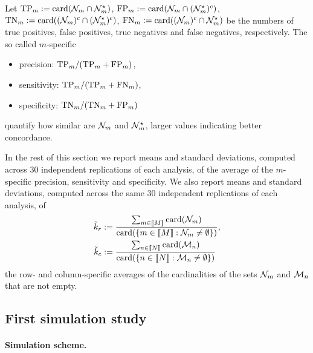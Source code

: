Let     $\text{TP}_{m}     :=      \operatorname{card}(\mathcal{N}_{m}     \cap     \mathcal{N}_{m}^{\star})$,
$\text{FP}_{m}      :=      \operatorname{card}(\mathcal{N}_{m}     \cap      (\mathcal{N}_{m}^{\star})^{c})$,
$\text{TN}_{m}    :=     \operatorname{card}((\mathcal{N}_{m})^{c}    \cap    (\mathcal{N}_{m}^{\star})^{c})$,
$\text{FN}_{m} :=  \operatorname{card}((\mathcal{N}_{m})^{c} \cap \mathcal{N}_{m}^{\star})$ be  the numbers of
true  positives,   false  positives,  true  negatives   and  false  negatives,
respectively. The so called $m$-specific
\begin{itemize}
\item precision: $\text{TP}_{m}/(\text{TP}_{m} + \text{FP}_{m})$,
\item sensitivity: $\text{TP}_{m}/(\text{TP}_{m}+\text{FN}_{m})$,
\item specificity: $\text{TN}_{m}/(\text{TN}_{m}+\text{FP}_{m})$
\end{itemize}
quantify how  similar are  $\mathcal{N}_{m}$ and $\mathcal{N}_{m}^{\star}$,  larger values
indicating better concordance.

In the rest of this section  we report means and standard deviations, computed
across 30  independent replications of  each analysis,  of the average  of the
$m$-specific precision, sensitivity and specificity.  We also report means and
standard deviations, computed  across the same 30  independent replications of
each analysis, of
\begin{align*}
  \tilde{k}_r &:=  \frac{\sum_{m \in  \llbracket M\rrbracket }\operatorname{card}(\mathcal{N}_{m})}{\operatorname{card}(\{  m\in \llbracket M\rrbracket:
                \mathcal{N}_m \neq \emptyset\})},\\ 
  \tilde{k}_c &:=  \frac{\sum_{n \in \llbracket N\rrbracket }\operatorname{card}(\mathcal{M}_{n})}{\operatorname{card}(\{  n\in \llbracket N\rrbracket:
                \mathcal{M}_n \neq \emptyset\})}
\end{align*}
the  row-  and column-specific  averages  of  the  cardinalities of  the  sets
$\mathcal{N}_{m}$ and $\mathcal{M}_{n}$ that are not empty. 




\subsection{First simulation study}
\label{subsec:simul:A}

\paragraph*{Simulation scheme.}

